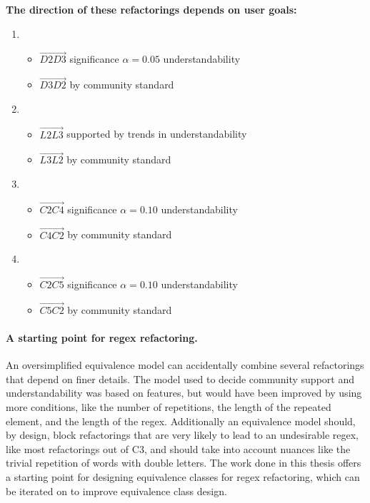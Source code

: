 \textbf{The direction of these refactorings depends on user goals:}
\begin{enumerate}
\item \begin{itemize}
\item   $\overrightarrow{D2 D3}$ significance $\alpha=0.05$ understandability
\item   $\overrightarrow{D3 D2}$ by community standard
\end{itemize}
\item \begin{itemize}
\item   $\overrightarrow{L2 L3}$ supported by trends in understandability
\item   $\overrightarrow{L3 L2}$ by community standard
\end{itemize}
\item \begin{itemize}
\item   $\overrightarrow{C2 C4}$ significance $\alpha=0.10$ understandability
\item   $\overrightarrow{C4 C2}$ by community standard
\end{itemize}
\item \begin{itemize}
\item   $\overrightarrow{C2 C5}$ significance $\alpha=0.10$ understandability
\item   $\overrightarrow{C5 C2}$ by community standard
\end{itemize}
\end{enumerate}


\paragraph{A starting point for regex refactoring.}  An oversimplified equivalence model can accidentally combine several refactorings that depend on finer details.  The model used to decide community support and understandability was based on features, but would have been improved by using more conditions, like the number of repetitions, the length of the repeated element, and the length of the regex.  Additionally an equivalence model should, by design, block refactorings that are very likely to lead to an undesirable regex, like most refactorings out of C3, and should take into account nuances like the trivial repetition of words with double letters. The work done in this thesis offers a starting point for designing equivalence classes for regex refactoring, which can be iterated on to improve equivalence class design.

